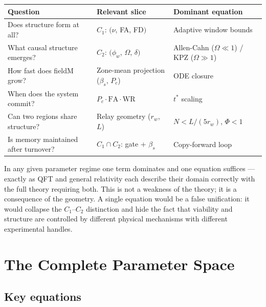 \documentclass[11pt]{article}
\begin{document}
\begin{center}
\begin{tabular}{lll}
\toprule
\textbf{Question} & \textbf{Relevant slice} & \textbf{Dominant equation} \\
\midrule
Does structure form at all?       & $C_1$: $(\nu$, FA, FD$)$              & Adaptive window bounds \\
What causal structure emerges?    & $C_2$: $(\phi_w$, $\Omega$, $\delta)$ & Allen-Cahn ($\Omega\!\ll\!1$) / KPZ ($\Omega\!\gg\!1$) \\
How fast does fieldM grow?        & Zone-mean projection ($\beta_s$, $P_c$) & ODE closure \\
When does the system commit?      & $P_c \cdot \mathrm{FA} \cdot \mathrm{WR}$ & $t^*$ scaling \\
Can two regions share structure?  & Relay geometry ($r_w$, $L$)           & $N < L/(5r_w)$, $\Phi < 1$ \\
Is memory maintained after turnover? & $C_1 \cap C_2$: gate + $\beta_s$   & Copy-forward loop \\
\bottomrule
\end{tabular}
\end{center}

In any given parameter regime one term dominates and one equation suffices ---
exactly as QFT and general relativity each describe their domain correctly
with the full theory requiring both.
This is not a weakness of the theory; it is a consequence of the geometry.
A single equation would be a false unification: it would collapse the $C_1$--$C_2$
distinction and hide the fact that viability and structure are controlled by
different physical mechanisms with different experimental handles.

\section{The Complete Parameter Space}

\subsection{Key equations}
\end{document}
